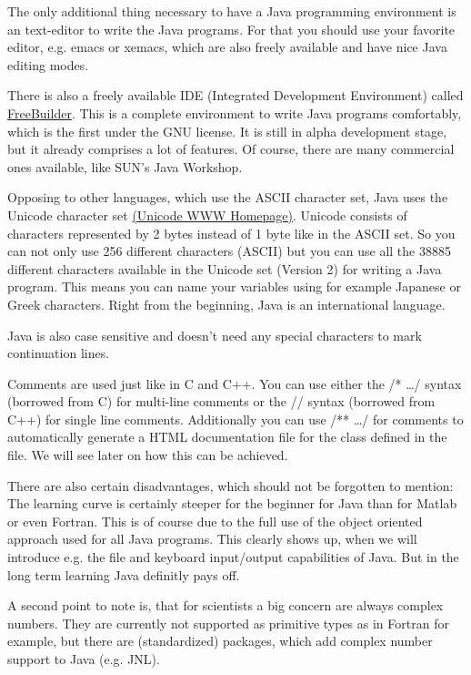 The only additional thing necessary to have a Java programming
environment is an text-editor to write the Java programs. For that
you should use your favorite editor, e.g. emacs or xemacs, which are
also freely available and have nice Java editing modes.

There is also a freely available IDE (Integrated Development 
Environment) called \href{http://www.freebuilder.org/}{FreeBuilder}.
This is a complete environment to write Java programs comfortably,
which is the first under the GNU license. It is still in alpha
development stage, but it already comprises a lot of features. Of
course, there are many commercial ones available, like SUN's Java Workshop.

Opposing to other languages, which use the ASCII character set, Java
uses the Unicode character set \href{http://unicode.org}{(Unicode WWW
Homepage)}. 
Unicode consists of characters represented
by 2 bytes instead of 1 byte like in the ASCII set. So you can not only
use 256 different characters (ASCII) but you can use all the 38885 different
characters available in the Unicode set (Version 2) for writing a Java program.
This means you can name your variables using for example Japanese or Greek
characters. Right from the beginning, Java is an international language.

Java is also case sensitive and doesn't need any special characters
to mark continuation lines. 

Comments are used just like in C and C++.
You can use either the /* \ldots */ syntax (borrowed from C) for
multi-line comments or the // syntax (borrowed from C++) for single
line comments. Additionally you can use /** \ldots */ for comments
to automatically generate a HTML documentation file for the class
defined in the file. We will see later on how this can be achieved.
 
There are also certain disadvantages, which should not be forgotten
to mention: The learning curve is certainly steeper for the beginner
for Java than for Matlab or even Fortran. This is of course due
to the full use of the object oriented approach used for all Java
programs. This clearly shows up, when we will introduce e.g. the
file and keyboard input/output capabilities of Java.
But in the long term learning Java definitly pays off. 

A second point to note is, that for scientists a big concern are always
complex numbers. They are currently not supported as primitive types as 
in Fortran for example, but there are (standardized) packages, which
add complex number support to Java (e.g. JNL). 


